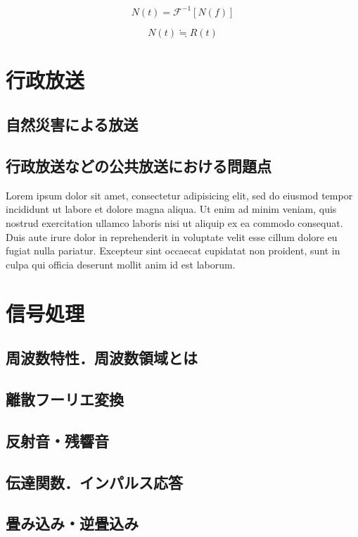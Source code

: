 \documentclass[a4j,12pt]{jarticle}
\begin{document}
\begin{equation}
  N(t) = \mathcal{F}^{-1}[N(f)]
\end{equation}

\begin{equation}
  N(t)\fallingdotseq R(t)
\end{equation}


\section{行政放送}
\subsection{自然災害による放送}
\subsection{行政放送などの公共放送における問題点}
Lorem ipsum dolor sit amet, consectetur adipisicing elit, sed do eiusmod tempor incididunt ut labore et dolore magna aliqua. Ut enim ad minim veniam, quis nostrud exercitation ullamco laboris nisi ut aliquip ex ea commodo consequat. Duis aute irure dolor in reprehenderit in voluptate velit esse cillum dolore eu fugiat nulla pariatur. Excepteur sint occaecat cupidatat non proident, sunt in culpa qui officia deserunt mollit anim id est laborum.

\section{信号処理}
\subsection{周波数特性．周波数領域とは}
\subsection{離散フーリエ変換}
\subsection{反射音・残響音}
\subsection{伝達関数．インパルス応答}
\subsection{畳み込み・逆畳込み}
\end{document}
